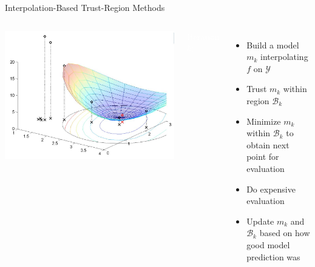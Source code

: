 \documentclass[handout,aspectratio=54]{beamer}
\numberwithin{theorem}{section}
\begin{document}
\begin{frame}{Interpolation-Based Trust-Region Methods}
\begin{columns}
\includegraphics[width=\textwidth]{fig/25-2.jpg}

\colorbox[rgb]{0.5,0.6,0.7}{\textcolor{white}{Iteration $k$:}}
\begin{itemize}\small
\item  Build a model $m_k$ interpolating $f$ on $\mathcal{Y}$
\item Trust $m_k$ within region $\mathcal{B}_k$
\item Minimize $m_k$ within $\mathcal{B}_k$ to obtain next point for evaluation
\item Do expensive evaluation
\item Update $m_k$ and $\mathcal{B}_k$ based on how good model prediction was
\end{itemize}
\end{columns}
\end{frame}
\end{document}
